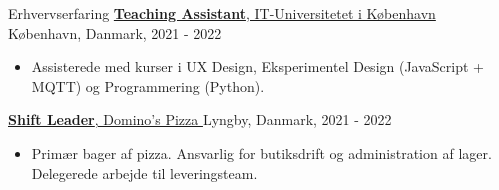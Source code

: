 \documentclass{resume}
\begin{document}
\begin{rSection}{Erhvervserfaring}
    \href{https://itu.dk}{
        \textbf{Teaching Assistant}, IT-Universitetet i København
    }
    \hfill
    København, Danmark, 2021 - 2022
    \begin{itemize}
        \item Assisterede med kurser i UX Design, Eksperimentel Design (JavaScript + MQTT) og Programmering (Python).
    \end{itemize}

    \href{https://www.dominos.dk}{
        \textbf{Shift Leader}, Domino's Pizza
    }
    \hfill
    Lyngby, Danmark, 2021 - 2022
    \begin{itemize}
        \item Primær bager af pizza. Ansvarlig for butiksdrift og administration af lager. Delegerede arbejde til leveringsteam.
    \end{itemize}
\end{rSection}

\end{document}
